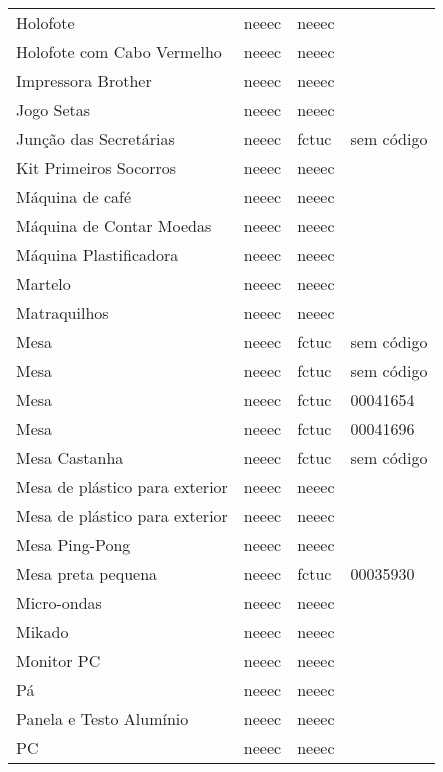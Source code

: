 \begin{longtable}{Xlll}
Holofote & \acrshort{neeec} & \acrshort{neeec} & \\
Holofote com Cabo Vermelho & \acrshort{neeec} & \acrshort{neeec} & \\
Impressora Brother & \acrshort{neeec} & \acrshort{neeec} & \\
Jogo Setas & \acrshort{neeec} & \acrshort{neeec} & \\
Junção das Secretárias & \acrshort{neeec} & \acrshort{fctuc} & sem código\\
Kit Primeiros Socorros & \acrshort{neeec} & \acrshort{neeec} & \\
Máquina de café & \acrshort{neeec} & \acrshort{neeec} & \\
Máquina de Contar Moedas & \acrshort{neeec} & \acrshort{neeec} & \\
Máquina Plastificadora & \acrshort{neeec} & \acrshort{neeec} & \\
Martelo & \acrshort{neeec} & \acrshort{neeec} & \\
Matraquilhos & \acrshort{neeec} & \acrshort{neeec} & \\
Mesa & \acrshort{neeec} & \acrshort{fctuc} & sem código\\
Mesa & \acrshort{neeec} & \acrshort{fctuc} & sem código\\
Mesa & \acrshort{neeec} & \acrshort{fctuc} & 00041654\\
Mesa & \acrshort{neeec} & \acrshort{fctuc} & 00041696\\
Mesa Castanha & \acrshort{neeec} & \acrshort{fctuc} & sem código\\
Mesa de plástico para exterior & \acrshort{neeec} & \acrshort{neeec} & \\
Mesa de plástico para exterior & \acrshort{neeec} & \acrshort{neeec} & \\
Mesa Ping-Pong & \acrshort{neeec} & \acrshort{neeec} & \\
Mesa preta pequena & \acrshort{neeec} & \acrshort{fctuc} & 00035930\\
Micro-ondas & \acrshort{neeec} & \acrshort{neeec} & \\
Mikado & \acrshort{neeec} & \acrshort{neeec} & \\
Monitor PC & \acrshort{neeec} & \acrshort{neeec} & \\
Pá & \acrshort{neeec} & \acrshort{neeec} & \\
Panela e Testo Alumínio & \acrshort{neeec} & \acrshort{neeec} & \\
PC & \acrshort{neeec} & \acrshort{neeec} & \\

\end{longtable}
